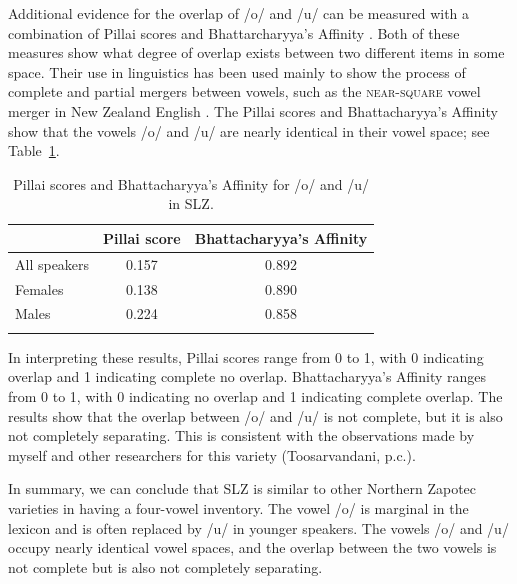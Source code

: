 Additional evidence for the overlap of /o/ and /u/ can be measured with a combination of Pillai scores \citep{pillaiNewTestCriteria1955,hayFactorsInfluencingSpeech2006,nyczBestPracticesMeasuring2014} and Bhattarcharyya's Affinity \citep{bhattacharyyaMeasureDivergenceTwo1943,johnsonQuantifyingOverlapBhattacharyyas2015,warrenQualityQuantityNew2018,strellufChapter3Low2018}. Both of these measures show what degree of overlap exists between two different items in some space. Their use in linguistics has been used mainly to show the process of complete and partial mergers between vowels, such as the \textsc{near-square} vowel merger in New Zealand English \citep{hayFactorsInfluencingSpeech2006}. The Pillai scores and Bhattacharyya's Affinity show that the vowels /o/ and /u/ are nearly identical in their vowel space; see Table~\ref{tab:SLZvowels_affinity}.

\begin{table}[h!]
    \centering
    \caption{Pillai scores and Bhattacharyya's Affinity for /o/ and /u/ in SLZ.}
    \label{tab:SLZvowels_affinity}
    \begin{tabular}{lcc}
        \lsptoprule
        &  Pillai score & Bhattacharyya's Affinity \\
        \midrule
        All speakers & 0.157 & 0.892 \\
        Females & 0.138 & 0.890 \\
        Males   & 0.224 & 0.858 \\
        \lspbottomrule
    \end{tabular}
\end{table}

In interpreting these results, Pillai scores range from 0 to 1, with 0 indicating overlap and 1 indicating complete no overlap. Bhattacharyya's Affinity ranges from 0 to 1, with 0 indicating no overlap and 1 indicating complete overlap. The results show that the overlap between /o/ and /u/ is not complete, but it is also not completely separating. This is consistent with the observations made by myself and other researchers for this variety (Toosarvandani, p.c.). 

In summary, we can conclude that SLZ is similar to other Northern Zapotec varieties in having a four-vowel inventory. The vowel /o/ is marginal in the lexicon and is often replaced by /u/ in younger speakers. The vowels /o/ and /u/ occupy nearly identical vowel spaces, and the overlap between the two vowels is not complete but is also not completely separating. 

